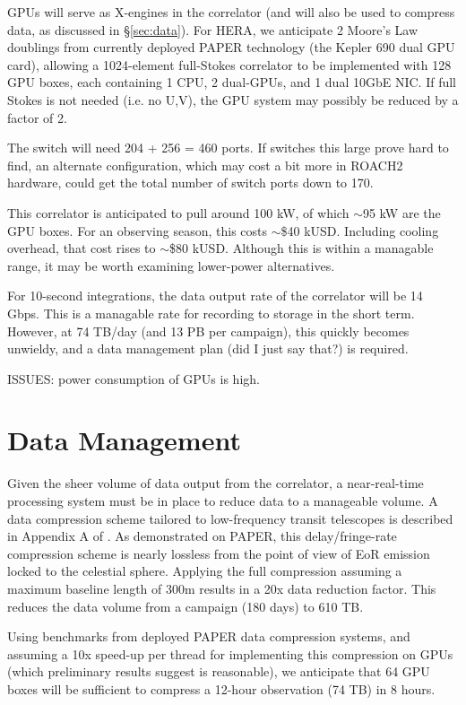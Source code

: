 \documentclass[11pt]{article}
\begin{document}
GPUs will serve as X-engines in the correlator (and will also be used to compress data, as discussed 
in \S\ref{sec:data}). For HERA, we anticipate 2 Moore's Law doublings from currently deployed PAPER
technology (the Kepler 690 dual GPU card), allowing a 1024-element full-Stokes correlator to be implemented with
128 GPU boxes, each containing 1
CPU, 2 dual-GPUs, and 1 dual 10GbE NIC.
If full Stokes is not
needed (i.e. no U,V), the GPU system may possibly be reduced by a factor of 2.

The switch will need 204 + 256 = 460 ports.  If switches this large prove hard to find,
an alternate configuration, which may cost a bit more in ROACH2 hardware, could get the total number of switch
ports down to 170.

This correlator is anticipated to pull around 100 kW, of which $\sim$95 kW are the GPU boxes.  For an observing
season, this costs $\sim$\$40 kUSD.  Including cooling overhead, that cost rises to $\sim$\$80 kUSD.  Although this
is within a managable range, it may be worth examining lower-power alternatives.  

For 10-second integrations, the data output rate of the correlator will be 14 Gbps.  This is a managable
rate for recording to storage in the short term.  However, at 74 TB/day (and 13 PB per campaign), this
quickly becomes unwieldy, and a data management plan (did I just say that?) is required.

ISSUES: power consumption of GPUs is high.

\section{Data Management}

Given the sheer volume of data output from the correlator, a near-real-time processing system must
be in place to reduce data to a manageable volume.  A data compression scheme tailored to low-frequency
transit telescopes is described in Appendix A of \citet{parsons_et_al2013}.
As demonstrated on PAPER, this delay/fringe-rate compression scheme is nearly lossless from
the point of view of EoR emission locked to the celestial sphere.  Applying the full compression assuming
a maximum baseline length of 300m results in a 20x data reduction factor.  This reduces the data volume
from a campaign (180 days) to 610 TB.

Using benchmarks from
deployed PAPER data compression systems, and assuming a 10x speed-up per thread for implementing this
compression on GPUs (which preliminary results suggest is reasonable), we anticipate that 64 GPU boxes
will be sufficient to compress a 12-hour observation (74 TB) in 8 hours.  
\end{document}
